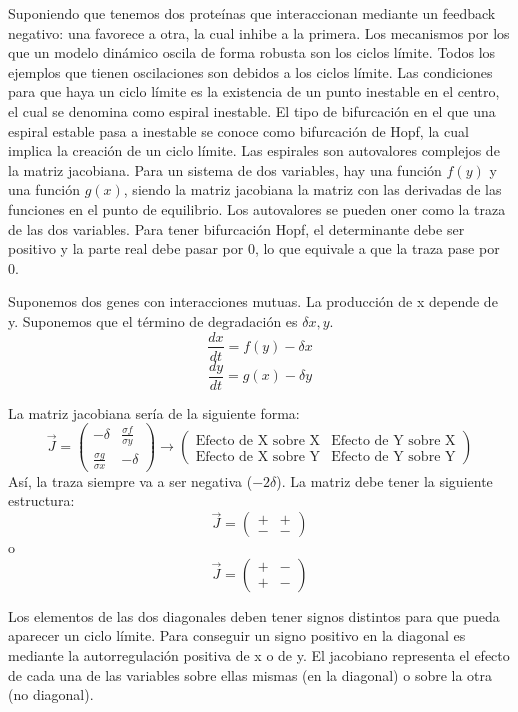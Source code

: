 Suponiendo que tenemos dos proteínas que interaccionan mediante un feedback negativo: una favorece a otra, la cual inhibe a la primera. Los mecanismos por los que un modelo dinámico oscila de forma robusta son los ciclos límite. Todos los ejemplos que tienen oscilaciones son debidos a los ciclos límite. Las condiciones para que haya un ciclo límite es la existencia de un punto inestable en el centro, el cual se denomina como espiral inestable. El tipo de bifurcación en el que una espiral estable pasa a inestable se conoce como bifurcación de Hopf, la cual implica la creación de un ciclo límite. Las espirales son autovalores complejos de la matriz jacobiana. Para un sistema de dos variables, hay una función $f(y)$ y una función $g(x)$, siendo la matriz jacobiana la matriz con las derivadas de las funciones en el punto de equilibrio. Los autovalores se pueden oner como la traza de las dos variables. Para tener bifurcación Hopf, el determinante debe ser positivo y la parte real debe pasar por 0, lo que equivale a que la traza pase por 0. 

Suponemos dos genes con interacciones mutuas. La producción de x depende de y. Suponemos que el término de degradación es $\delta x,y$.
$$\frac{dx}{dt} = f(y) - \delta x$$
$$\frac{dy}{dt} = g(x) - \delta y$$

La matriz jacobiana sería de la siguiente forma:
$$\vec{J} = \begin{pmatrix}
- \delta & \frac{\sigma f}{\sigma y} \\
\frac{\sigma g}{\sigma x} & - \delta
\end{pmatrix} \rightarrow \begin{pmatrix}
\text{Efecto de X sobre X} & \text{Efecto de Y sobre X} \\
\text{Efecto de X sobre Y} & \text{Efecto de Y sobre Y}
\end{pmatrix}$$
Así, la traza siempre va a ser negativa ($-2 \delta$). La matriz debe tener la siguiente estructura:
$$\vec{J} = \begin{pmatrix}
+ & + \\
- & -
\end{pmatrix}$$
o
$$\vec{J} = \begin{pmatrix}
+ & - \\
+ & -
\end{pmatrix}$$

Los elementos de las dos diagonales deben tener signos distintos para que pueda aparecer un ciclo límite. Para conseguir un signo positivo en la diagonal es mediante la autorregulación positiva de x o de y. El jacobiano representa el efecto de cada una de las variables sobre ellas mismas (en la diagonal) o sobre la otra (no diagonal).

